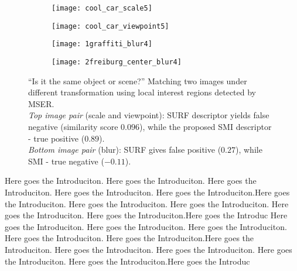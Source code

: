 \documentclass[a4paper,11pt]{article}
\begin{document}
\begin{wrapfigure}{r}{0.5\textwidth}
 \vspace{-20pt} 
\begin{center}
\begin{subfigure}[b]{0.247\textwidth}
  \texttt{[image: cool\_car\_scale5]}
\end{subfigure}
\begin{subfigure}[b]{0.247\textwidth}
\texttt{[image: cool\_car\_viewpoint5]}
\end{subfigure}
\end{center}
\vspace{-20pt}
\begin{center}
\begin{subfigure}[b]{0.247\textwidth}
  \texttt{[image: 1graffiti\_blur4]}
\end{subfigure}
\begin{subfigure}[b]{0.247\textwidth}
\texttt{[image: 2freiburg\_center\_blur4]}
\end{subfigure}
\end{center}
\vspace{-20pt}
\caption{``Is it the same object or scene?'' Matching two images under different transformation using local interest regions detected by MSER.\\ {\em Top image pair} (scale and viewpoint): SURF descriptor yields false negative (similarity score $0.096$), while the proposed SMI descriptor - true positive ($0.89$).\\
{\em Bottom image pair} (blur): SURF gives false positive ($0.27$), while SMI - true negative ($-0.11$).}
  \vspace{-10pt}
\end{wrapfigure}\label{fig:intro1}
Here goes the Introduciton. Here goes the Introduciton. Here goes the Introduciton. Here goes the Introduciton. Here goes the Introduciton.Here goes the Introduciton. Here goes the Introduciton. Here goes the Introduciton. Here goes the Introduciton. Here goes the Introduciton.Here goes the Introduc
Here goes the Introduciton. Here goes the Introduciton. Here goes the Introduciton. Here goes the Introduciton. Here goes the Introduciton.Here goes the Introduciton. Here goes the Introduciton. Here goes the Introduciton. Here goes the Introduciton. Here goes the Introduciton.Here goes the Introduc
\end{document}

